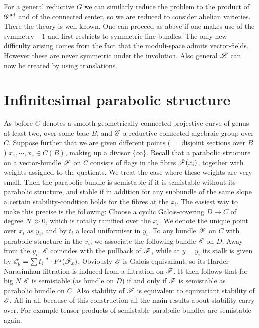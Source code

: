 \documentclass[12pt,english]{smfart}
\theoremstyle{plain} \newtheorem{innerthm}{Theorem} \newtheorem{innerlem}{Lemma} \newtheorem{innerprop}{Proposition} \newtheorem{innercor}{Corollary} \theoremstyle{definition} \newtheorem{innerdefn}{Definition} \newtheorem{innerconstr}{Construction} \theoremstyle{remark} \newtheorem*{remark}{Remark} \newtheorem*{remarks}{Remarks} \newtheorem*{applications}{Applications}
\begin{document}
For a general reductive $G$ we can similarly reduce the problem to the product of $\mathscr{G}^{\mathrm{ad}}$ and of the connected center, so we are reduced to consider abelian varieties. There the theory is well known. One can proceed as above if one makes use of the symmetry $-1$ and first restricts to symmetric line-bundles: The only new difficulty arising comes from the fact that the moduli-space admits vector-fields. However these are never symmetric under the involution. Also general $\mathscr{L}$ can now be treated by using translations.


\section{Infinitesimal parabolic structure}\label{sec:V}

As before $C$ denotes a smooth geometrically connected projective curve of genus at least two, over some base $B$, and $\mathscr{G}$ a reductive connected algebraic group over $C$. Suppose further that we are given different points ($=$ disjoint sections over $B$) $x_1,\cdots,x_s\in C(B)$, making up a divisor $\{\infty\}$. Recall that a parabolic structure on a vector-bundle $\mathscr{F}$ on $C$ consists of flags in the fibres $\mathscr{F}(x_i)$, together with weights assigned to the quotients. We treat the case where these weights are very small. Then the parabolic bundle is semistable if it is semistable without its parabolic structure, and stable if in addition for any subbundle of the same slope a certain stability-condition holds for the fibres at the $x_i$. The easiest way to make this precise is the following: Choose a cyclic Galois-covering $D\to C$ of degree $N\gg 0$, which is totally ramified over the $x_i$. We denote the unique point over $x_i$ as $y_i$, and by $t_i$ a local uniformiser in $y_i$. To any bundle $\mathscr{F}$ on $C$ with parabolic structure in the $x_i$, we associate the following bundle $\mathscr{E}$ on $D$: Away from the $y_i$, $\mathscr{E}$ coincides with the pullback of $\mathscr{F}$, while at $y=y_i$ its stalk is given by $\mathscr{E}_y=\sum t_i^{-j}\cdot F^j(\mathscr{F}_x)$. Obviously $\mathscr{E}$ is Galois-equivariant, so its Harder-Narasimhan filtration is induced from a filtration on $\mathscr{F}$. It then follows that for big $N$ $\mathscr{E}$ is semistable (as bundle on $D$) if and only if $\mathscr{F}$ is semistable as parabolic bundle on $C$. Also stability of $\mathscr{F}$ is equivalent to equivariant stability of $\mathscr{E}$. All in all because of this construction all the main results about stability carry over. For example tensor-products of semistable parabolic bundles are semistable again.
\end{document}
